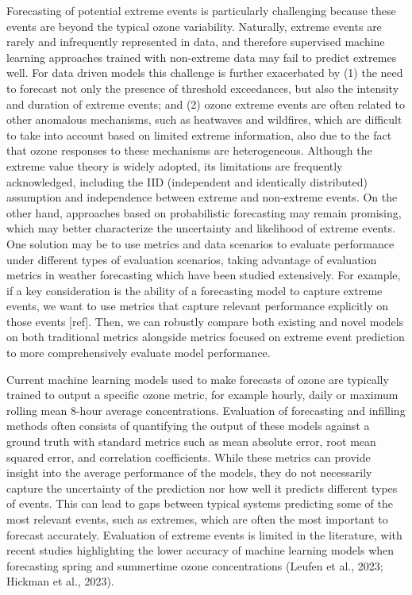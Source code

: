 \documentclass[gmd, manuscript]{copernicus}
\begin{document}
Forecasting of potential extreme events is particularly challenging because these events are beyond the typical ozone variability. Naturally, extreme events are rarely and infrequently represented in data, and therefore supervised machine learning approaches trained with non-extreme data may fail to predict extremes well. For data driven models this challenge is further exacerbated by (1) the need to forecast not only the presence of threshold exceedances, but also the intensity and duration of extreme events; and (2) ozone extreme events are often related to other anomalous mechanisms, such as heatwaves and wildfires, which are difficult to take into account based on limited extreme information, also due to the fact that ozone responses to these mechanisms are heterogeneous. Although the extreme value theory is widely adopted, its limitations are frequently acknowledged, including the IID (independent and identically distributed) assumption and independence between extreme and non-extreme events. On the other hand, approaches based on probabilistic forecasting may remain promising, which may better characterize the uncertainty and likelihood of extreme events. One solution may be to use metrics and data scenarios to evaluate performance under different types of evaluation scenarios, taking advantage of evaluation metrics in weather forecasting which have been studied extensively. For example, if a key consideration is the ability of a forecasting model to capture extreme events, we want to use metrics that capture relevant performance explicitly on those events [ref]. Then, we can robustly compare both existing and novel models on both traditional metrics alongside metrics focused on extreme event prediction to more comprehensively evaluate model performance.  

Current machine learning models used to make forecasts of ozone are typically trained to output a specific ozone metric, for example hourly, daily or maximum rolling mean 8-hour average concentrations. Evaluation of forecasting and infilling methods often consists of quantifying the output of these models against a ground truth with standard metrics such as mean absolute error, root mean squared error, and correlation coefficients. While these metrics can provide insight into the average performance of the models, they do not necessarily capture the uncertainty of the prediction nor how well it predicts different types of events. This can lead to gaps between typical systems predicting some of the most relevant events, such as extremes, which are often the most important to forecast accurately. Evaluation of extreme events is limited in the literature, with recent studies highlighting the lower accuracy of machine learning models when forecasting spring and summertime ozone concentrations (Leufen et al., 2023; Hickman et al., 2023). 
\end{document}
